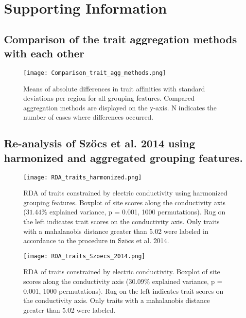 \documentclass[../Draft_harmonization_paper.tex]{subfiles}
\begin{document}
\section*{Supporting Information}

\subsection*{Comparison of the trait aggregation methods with each other}

\begin{figure}[H]
    \centering
    \texttt{[image: Comparison\_trait\_agg\_methods.png]}
    \caption{Means of absolute differences in trait affinities with standard deviations per region for all grouping features. Compared aggregation methods are displayed on the y-axis. N indicates the number of cases where differences occurred.}
\end{figure}


\newpage

\subsection*{Re-analysis of Szöcs et al. 2014 using harmonized and aggregated grouping features.}
\label{subsec:SI_szoecs_reanalysis}

\begin{figure}[H]
    \centering
    \texttt{[image: RDA\_traits\_harmonized.png]}
    \caption{RDA of traits constrained by electric conductivity using harmonized grouping features. Boxplot of site scores along the conductivity axis ($31.44 \%$ explained variance, p = 0.001, 1000 permutations). Rug on the left indicates trait scores on the conductivity axis. Only traits with a mahalanobis distance greater than 5.02 were labeled in accordance to the procedure in Szöcs et al. 2014.
    } 
\end{figure}

\begin{figure}[H]
    \centering
    \texttt{[image: RDA\_traits\_Szoecs\_2014.png]}
    \caption{RDA of traits constrained by electric conductivity. Boxplot of site scores along the conductivity axis ($30.09 \%$ explained variance, p = 0.001, 1000 permutations). Rug on the left indicates trait scores on the conductivity axis. Only traits with a mahalanobis distance greater than 5.02 were labeled.
    } 
\end{figure}
\end{document}
